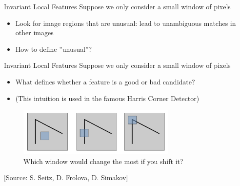 \begin{frame}{Invariant Local Features}
Suppose we only consider a small window of pixels
\begin{itemize}
    \item Look for image regions that are unusual: lead to unambiguous matches in other images
    \item How to define ”unusual”?
\end{itemize}
\end{frame}

\begin{frame}{Invariant Local Features}
Suppose we only consider a small window of pixels
\begin{itemize}
    \item What defines whether a feature is a good or bad candidate?
    \item (This intuition is used in the famous Harris Corner Detector)
\end{itemize}
 \begin{figure}
    \centering
    \includegraphics[width=0.7\textwidth]{img/edgebest.png}
    \caption{Which window would change the most if you shift it?}
\end{figure}  
    [Source: S. Seitz, D. Frolova, D. Simakov]

\end{frame}


